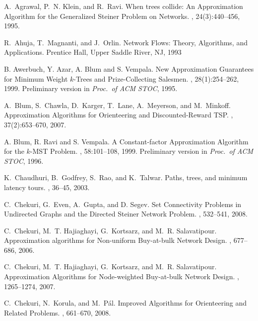 \documentclass[11pt]{article}
\begin{document}
\begin{thebibliography}{99}
A.~Agrawal, P.~N. Klein, and R.~Ravi.
\newblock When trees collide: An Approximation Algorithm for the Generalized
  {S}teiner Problem on Networks.
, 24(3):440--456, 1995.

R.~Ahuja, T.~Magnanti, and J.~Orlin.
\newblock Network Flows: Theory, Algorithms, and Applications.
\newblock Prentice Hall, Upper Saddle River, NJ, 1993

B. Awerbuch, Y. Azar, A. Blum and S. Vempala.
\newblock  New Approximation Guarantees for Minimum Weight $k$-Trees and 
Prize-Collecting Salesmen.
, 28(1):254--262, 1999. Preliminary
version in {\em Proc.\ of ACM STOC}, 1995.

A.~Blum, S.~Chawla, D.~Karger, T.~Lane, A.~Meyerson, and M.~Minkoff.
\newblock Approximation Algorithms for Orienteering and Discounted-Reward TSP.
, 37(2):653--670, 2007.

A. Blum, R. Ravi and S. Vempala.
\newblock  A Constant-factor Approximation Algorithm for the $k$-MST Problem.
, 58:101--108, 1999.
\newblock Preliminary version in {\em Proc.\ of ACM STOC}, 1996.

K.~Chaudhuri, B.~Godfrey, S.~Rao, and K.~Talwar.
\newblock Paths, trees, and minimum latency tours.
, 36--45, 2003.

C.~Chekuri, G.~Even, A.~Gupta, and D. Segev.
\newblock Set Connectivity Problems in Undirected Graphs and the 
Directed Steiner Network Problem.
, 532--541, 2008.

C.~Chekuri, M.~T. Hajiaghayi, G.~Kortsarz, and M.~R. Salavatipour.
\newblock Approximation algorithms for Non-uniform Buy-at-bulk Network Design.
, 677--686, 2006.

C.~Chekuri, M.~T. Hajiaghayi, G.~Kortsarz, and M.~R. Salavatipour.
\newblock Approximation Algorithms for Node-weighted Buy-at-bulk Network
  Design.
, 1265--1274, 2007.

C.~Chekuri, N.~Korula, and M.~P\'{a}l.
\newblock Improved Algorithms for Orienteering and Related Problems.
, 661--670, 2008.


\end{thebibliography}
\end{document}
